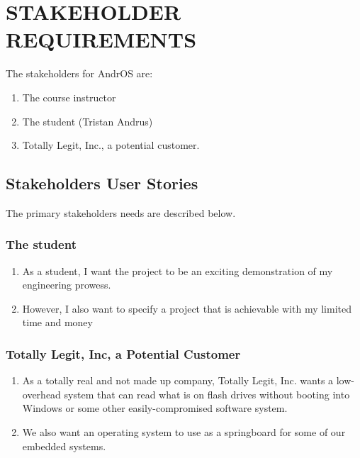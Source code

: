 \section{STAKEHOLDER REQUIREMENTS} %
The stakeholders for AndrOS are:

\begin{enumerate}
	\item The course instructor
  \item The student (Tristan Andrus)
  \item Totally Legit, Inc., a potential customer.
\end{enumerate}


\subsection{Stakeholders User Stories}
The primary stakeholders needs are described below.

%




\subsubsection{The student}
\begin{enumerate}
  \item As a student, I want the project to be an exciting demonstration of my engineering prowess.
  \item However, I also want to specify a project that is achievable with my limited time and money
\end{enumerate}


\subsubsection{Totally Legit, Inc, a Potential Customer}
\begin{enumerate}
  \item As a totally real and not made up company, Totally Legit, Inc. wants a low-overhead system that can read what is on flash drives without booting into Windows or some other easily-compromised software system.
  \item We also want an operating system to use as a springboard for some of our embedded systems.
\end{enumerate}

